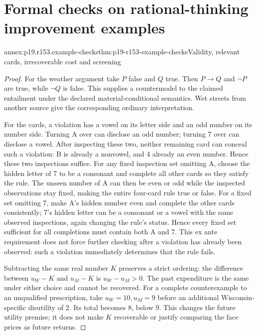 \section{Formal checks on rational-thinking improvement examples}
\label{sec:p19-annex-rationality-15-3}

\begin{annexitem}{annex:p19.r153.example-checks}{thm:p19-r153-example-checks}{Validity, relevant cards, irrecoverable cost and screening}
\begin{proof}
For the weather argument take \(P\) false and \(Q\) true.
Then \(P\to Q\) and \(\neg P\) are true, while
\(\neg Q\) is false. This supplies a countermodel to the claimed
entailment under the declared material-conditional semantics. Wet streets
from another source give the corresponding ordinary interpretation.

For the cards, a violation has a vowel on its letter side and an odd
number on its number side. Turning A over can disclose an odd number;
turning 7 over can disclose a vowel. After inspecting these two, neither
remaining card can conceal such a violation: B is already a nonvowel,
and 4 already an even number. Hence these two inspections suffice.
For any fixed inspection set omitting A, choose the hidden letter of 7
to be a consonant and complete all other cards so they satisfy the rule.
The unseen number of A can then be even or odd while the inspected
observations stay fixed, making the entire four-card rule true or false.
For a fixed set omitting 7, make A's hidden number even and complete
the other cards consistently; 7's hidden letter can be a consonant or
a vowel with the same observed inspections, again changing the rule's
status. Hence every fixed set sufficient for all completions must contain
both A and 7. This ex ante requirement does not force further checking
after a violation has already been observed: such a violation immediately
determines that the rule fails.

Subtracting the same real number \(K\) preserves a strict ordering:
the difference between \(u_W-K\) and \(u_M-K\) is
\(u_W-u_M>0\). The past expenditure is the same under either
choice and cannot be recovered. For a complete counterexample to an
unqualified prescription, take \(u_W=10,u_M=9\) before an additional
Wisconsin-specific disutility of 2. Its total becomes 8, below 9.
This changes the future utility premise; it does not make \(K\)
recoverable or justify comparing the face prices as future returns.


\end{proof}
\end{annexitem}
